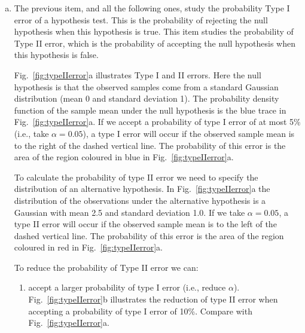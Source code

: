 \documentclass[12pt]{article}
\begin{document}
\begin{enumerate}[(a)]
\begin{figure}[H]
\begin{center}
                \label{fig:ex1a}

            \end{center}
        \end{figure}

    \item  The previous item, and all the following ones, study the probability
        Type I error of a hypothesis test. This is the probability of rejecting
        the null hypothesis when this hypothesis is true.
        This item studies the probability of Type II error, which is the
        probability of accepting the null hypothesis when this hypothesis is
        false.

        Fig.~\ref{fig:typeIIerror}a illustrates Type I
        and II errors. Here the null hypothesis is that the observed samples
        come from a standard Gaussian distribution (mean 0 and standard
        deviation 1). The probability density function of the sample mean
        under the null hypothesis is the blue trace in
        Fig.~\ref{fig:typeIIerror}a.
        If we accept a probability of type I error of at most 5\%
        (i.e., take $\alpha=0.05$), a type I error will occur if the
        observed sample mean is to the right of the dashed vertical line. The
        probability of this error is the area of the region coloured in blue in
        Fig.~\ref{fig:typeIIerror}a.

        To calculate the probability of type II error we need to specify the
        distribution of an alternative hypothesis. In
        Fig.~\ref{fig:typeIIerror}a the distribution of
        the observations under the alternative hypothesis is a Gaussian with
        mean 2.5 and standard deviation 1.0. If we take $\alpha=0.05$, a type
        II error will occur if the observed sample mean is to the left of the
        dashed vertical line. The probability of this error is the area of the
        region coloured in red in
        Fig.~\ref{fig:typeIIerror}a.

        To reduce the probability of Type II error we can:

        \begin{enumerate}[1.]

            \item accept a larger probability of type I error (i.e., reduce
                $\alpha$).
                Fig.~\ref{fig:typeIIerror}b
                illustrates the reduction of type II error when accepting a
                probability of type I error of 10\%. Compare with
                Fig.~\ref{fig:typeIIerror}a.


\end{enumerate}
\end{enumerate}
\end{document}
